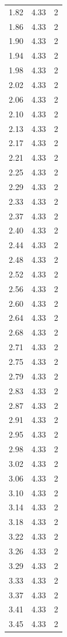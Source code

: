 \begin{longtable}{lrr}
  1.82 & 4.33 & 2 \\
  1.86 & 4.33 & 2 \\
  1.90 & 4.33 & 2 \\
  1.94 & 4.33 & 2 \\
  1.98 & 4.33 & 2 \\
  2.02 & 4.33 & 2 \\
  2.06 & 4.33 & 2 \\
  2.10 & 4.33 & 2 \\
  2.13 & 4.33 & 2 \\
  2.17 & 4.33 & 2 \\
  2.21 & 4.33 & 2 \\
  2.25 & 4.33 & 2 \\
  2.29 & 4.33 & 2 \\
  2.33 & 4.33 & 2 \\
  2.37 & 4.33 & 2 \\
  2.40 & 4.33 & 2 \\
  2.44 & 4.33 & 2 \\
  2.48 & 4.33 & 2 \\
  2.52 & 4.33 & 2 \\
  2.56 & 4.33 & 2 \\
  2.60 & 4.33 & 2 \\
  2.64 & 4.33 & 2 \\
  2.68 & 4.33 & 2 \\
  2.71 & 4.33 & 2 \\
  2.75 & 4.33 & 2 \\
  2.79 & 4.33 & 2 \\
  2.83 & 4.33 & 2 \\
  2.87 & 4.33 & 2 \\
  2.91 & 4.33 & 2 \\
  2.95 & 4.33 & 2 \\
  2.98 & 4.33 & 2 \\
  3.02 & 4.33 & 2 \\
  3.06 & 4.33 & 2 \\
  3.10 & 4.33 & 2 \\
  3.14 & 4.33 & 2 \\
  3.18 & 4.33 & 2 \\
  3.22 & 4.33 & 2 \\
  3.26 & 4.33 & 2 \\
  3.29 & 4.33 & 2 \\
  3.33 & 4.33 & 2 \\
  3.37 & 4.33 & 2 \\
  3.41 & 4.33 & 2 \\
  3.45 & 4.33 & 2 \\

\end{longtable}
